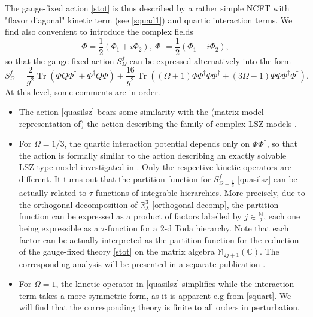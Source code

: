 \documentclass[a4paper,11pt,twoside]{article}
\numberwithin{equation}{section}
\DeclareMathOperator{\tr}{Tr}
\theoremstyle{nonumberplain}
\newcounter{and}
\begin{document}
%
The gauge-fixed action \eqref{stot} is thus described by a rather simple NCFT with "flavor diagonal" kinetic term (see \eqref{squad1}) and quartic interaction terms. We find also convenient to introduce the complex fields%
%
\begin{equation}
\Phi=\frac{1}{2}(\Phi_1+i\Phi_2),\ \Phi^\dag=\frac{1}{2}(\Phi_1-i\Phi_2),
\end{equation}
%
so that the gauge-fixed action $S^f_\Omega$ can be expressed alternatively into the form%
%
\begin{equation}
S^f_\Omega = \frac{2}{g^2} \tr\left( \Phi Q \Phi^\dag + \Phi^\dag Q\Phi \right) + \frac{16}{g^2} \tr\left( (\Omega+1) \Phi\Phi^\dag\Phi\Phi^\dag + (3\Omega-1) \Phi\Phi\Phi^\dag\Phi^\dag \right) .
\label{quasilsz}
\end{equation}
%
At this level, some comments are in order.
\begin{itemize}
%
\item The action \eqref{quasilsz} bears some similarity with the (matrix model representation of) the action describing the family of complex LSZ models \cite{LSZ}.%

\item For $\Omega=1/3$, the quartic interaction potential depends only on $\Phi\Phi^\dag$, so that the action is formally similar to the action describing an exactly solvable LSZ-type model investigated in \cite{LSZ}. Only the respective kinetic operators are different. It turns out that the partition function for $S^f_{\Omega=\frac{1}{3}}$ \eqref{quasilsz} can be actually related to $\tau$-functions of integrable hierarchies. More precisely, due to the orthogonal decomposition of $\mathbb{R}^3_\lambda$ 
\eqref{orthogonal-decomp}, the partition function can be expressed as a product of factors labelled by $j\in\frac{\mathbb{N}}{2}$, each one being expressible as a $\tau$-function for a 2-d Toda hierarchy. Note that each factor can be actually interpreted as the partition function for the reduction of the gauge-fixed theory \eqref{stot} on the matrix algebra $\mathbb{M}_{2j+1}(\mathbb{C})$. The corresponding analysis will be presented in a separate publication \cite{solvab-15}.

\item For $\Omega=1$, the kinetic operator in \eqref{quasilsz} simplifies while the interaction term takes a more symmetric form, as it is apparent e.g from \eqref{squart}. We will find that the corresponding theory is finite to all orders in perturbation.%
%
\end{itemize}
\end{document}
